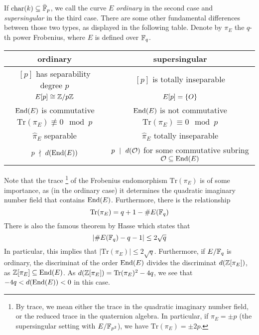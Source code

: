 If $\mathrm{char}(k) \subseteq \bar{\mathbb{F}}_p$, we call the curve $E$ \emph{ordinary} in the second case and \emph{supersingular} in the third case.
There are some other fundamental differences between those two types, as displayed in the following table.
Denote by $\pi_E$ the $q$-th power Frobenius, where $E$ is defined over $\mathbb{F}_q$.
\begin{center}
    \begin{tabular}{c | c}
        ordinary & supersingular \\
        \hline
        $[p]$ has separability degree $p$ & $[p]$ is totally inseparable \\
        $E[p] \cong \mathbb{Z}/p\mathbb{Z}$ & $E[p] = \{ O \}$ \\
        $\mathrm{End}(E)$ is commutative & $\mathrm{End}(E)$ is not commutative \\
        $\mathrm{Tr}(\pi_E) \not\equiv 0 \mod p$ & $\mathrm{Tr}(\pi_E) \equiv 0 \mod p$ \\
        $\hat{\pi}_E$ separable & $\hat{\pi}_E$ totally inseparable \\
        $p \ \nmid \  d(\mathrm{End}(E))$ & $p \ \mid \  d(\mathcal{O})$ for some commutative subring $\mathcal{O} \subseteq \mathrm{End}(E)$
    \end{tabular}
\end{center}
Note that the trace
\footnote{By trace, we mean either the trace in the quadratic imaginary number field, or the reduced trace in the quaternion algebra. In particular, if $\pi_E = \pm p$ (the supersingular setting with $E/\mathbb{F}_{p^2}$), we have $\mathrm{Tr}(\pi_E) = \pm 2p$.}
of the Frobenius endomorphism $\mathrm{Tr}(\pi_E)$ is of some importance, as (in the ordinary case) it determines the quadratic imaginary number field that contains $\mathrm{End}(E)$.
Furthermore, there is the relationship
\begin{equation*}
    \mathrm{Tr}(\pi_E) = q + 1 - \#E(\mathbb{F}_q)
\end{equation*}
There is also the famous theorem by Hasse \cite[Thm V.1.1]{arithmetic_elliptic_curves} which states that
\begin{equation*}
    |\#E(\mathbb{F}_q) - q - 1| \leq 2\sqrt{q}
\end{equation*}
In particular, this implies that $|\mathrm{Tr}(\pi_E)| \leq 2\sqrt{q}$.
Furthermore, if $E/\mathbb{F}_q$ is ordinary, the discriminat of the order $\mathrm{End}(E)$ divides the discriminat $d(\mathbb{Z}[\pi_E])$, as $\mathbb{Z}[\pi_E] \subseteq \mathrm{End}(E)$.
As $d(\mathbb{Z}[\pi_E]) = \mathrm{Tr}(\pi_E)^2 - 4q$, we see that $-4q < d(\mathrm{End}(E)) < 0$ in this case.

